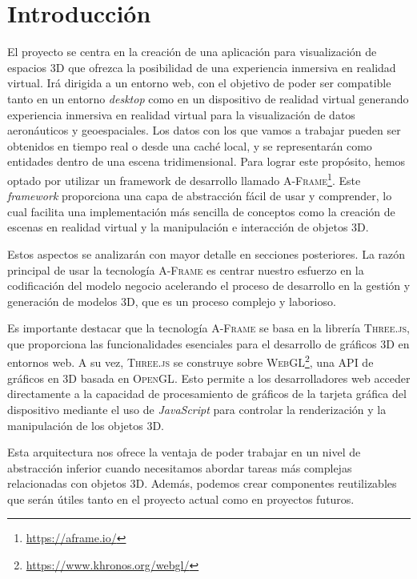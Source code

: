\documentclass[a4paper, 11pt]{book}
\begin{document}
\cleardoublepage
\chapter{Introducción}
\label{sec:intro} %
El proyecto se centra en la creación de una aplicación para visualización de espacios \textsc{\gls{3D}} que ofrezca la posibilidad de una experiencia inmersiva en realidad virtual.
Irá dirigida a un entorno web, con el objetivo de poder ser compatible tanto en un entorno \emph{desktop} como en un dispositivo de realidad virtual generando experiencia inmersiva en realidad virtual para la visualización de datos aeronáuticos y geoespaciales. 
Los datos con los que vamos a trabajar pueden ser obtenidos en tiempo real o desde una caché local, y se representarán como entidades dentro de una escena tridimensional.
Para lograr este propósito, hemos optado por utilizar un \Gls{framework} de desarrollo llamado \textsc{A-Frame}\footnote{\url{https://aframe.io/}}. Este \emph{framework} proporciona una capa de abstracción fácil de usar y comprender, lo cual facilita una implementación más sencilla de conceptos como la creación de escenas en realidad virtual y la manipulación e interacción de objetos \textsc{3D}. 

Estos aspectos se analizarán con mayor detalle en secciones posteriores. 
La razón principal de usar la tecnología \textsc{A-Frame} es centrar nuestro esfuerzo en la codificación del modelo negocio acelerando el proceso de desarrollo en la gestión y generación de modelos \textsc{3D}, que es un proceso complejo y laborioso.

Es importante destacar que la tecnología \textsc{A-Frame} se basa en la librería \textsc{Three.js}, que proporciona las funcionalidades esenciales para el desarrollo de gráficos \textsc{3D} en entornos web. A su vez, \textsc{Three.js} se construye sobre \textsc{\gls{WebGL}}\footnote{\url{https://www.khronos.org/webgl/}}, una \Gls{API} de gráficos en \textsc{3D} basada en \textsc{OpenGL}. Esto permite a los desarrolladores web acceder directamente a la capacidad de procesamiento de gráficos de la tarjeta gráfica del dispositivo mediante el uso de \emph{JavaScript} para controlar la \gls{renderización} y la manipulación de los objetos \textsc{3D}.

Esta arquitectura nos ofrece la ventaja de poder trabajar en un nivel de abstracción inferior cuando necesitamos abordar tareas más complejas relacionadas con objetos \textsc{3D}. Además, podemos crear componentes reutilizables que serán útiles tanto en el proyecto actual como en proyectos futuros.
\end{document}
